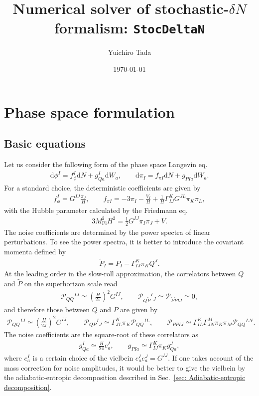 \documentclass[aps, prd
, preprint
, nofootinbib 
, longbibliography
]{revtex4-1}
\newcommand{\dd}{\mathrm{d}}
\newcommand{\Mpl}{M_\text{Pl}}
\newcommand{\calP}{\mathcal{P}}
\newcommand{\bae}[1]{\begin{align} #1 \end{align}}
\begin{document}
\title{Numerical solver of stochastic-$\delta N$ formalism: \texttt{StocDeltaN}}
\date{\today}

\author{Yuichiro Tada}

\begin{abstract}
\end{abstract}

\maketitle




\section{Phase space formulation}

\subsection{Basic equations}

Let us consider the following form of the phase space Langevin eq.
\bae{
	\dd\phi^I=f_\phi^I\dd N+g^I_{Qa}\dd W_a, \qquad \dd\pi_I=f_{\pi I}\dd N+g_{PIa}\dd W_a.
}
For a standard choice, the deterministic coefficients are given by
\bae{
	f_\phi^I=G^{IJ}\frac{\pi_J}{H}, \qquad f_{\pi I}=-3\pi_I-\frac{V_I}{H}+\frac{1}{H}\Gamma^K_{IJ}G^{JL}\pi_K\pi_L,
}
with the Hubble parameter calculated by the Friedmann eq.
\bae{
	3\Mpl^2H^2=\frac{1}{2}G^{IJ}\pi_I\pi_J+V.
}
The noise coefficients are determined by the power spectra of linear perturbations. To see the power spectra, it is better to introduce the covariant momenta defined by
\bae{
	\tilde{P}_I=P_I-\Gamma^K_{IJ}\pi_KQ^J.
}
At the leading order in the slow-roll approximation, the correlators between $Q$ and $\tilde{P}$ on the superhorizon scale read
\bae{
	\calP_{QQ}{}^{IJ}\simeq\left(\frac{H}{2\pi}\right)^2G^{IJ}, \qquad \calP_{Q\tilde{P}}{}^I{}_J\simeq\calP_{\tilde{P}\tilde{P}IJ}\simeq0,
}
and therefore those between $Q$ and $P$ are given by
\bae{
	\calP_{QQ}{}^{IJ}\simeq\left(\frac{H}{2\pi}\right)^2G^{IJ}, \qquad \calP_{QP}{}^I{}_J\simeq\Gamma^K_{JL}\pi_K\calP_{QQ}{}^{IL},
	\qquad \calP_{PPIJ}\simeq\Gamma^K_{IL}\Gamma^M_{JN}\pi_K\pi_M\calP_{QQ}{}^{LN}.
}
The noise coefficients are the square-root of these correlators as
\bae{
	g^I_{Qa}\simeq\frac{H}{2\pi}e^I_a, \qquad g_{PIa}\simeq\Gamma^K_{IJ}\pi_Kg^J_{Qa},
}
where $e^I_a$ is a certain choice of the vielbein $e^I_ae^J_a=G^{IJ}$. If one takes account of the mass correction for noise amplitudes,
it would be better to give the vielbein by the adiabatic-entropic decomposition described in Sec.~\ref{sec: Adiabatic-entropic decomposition}.
\end{document}
